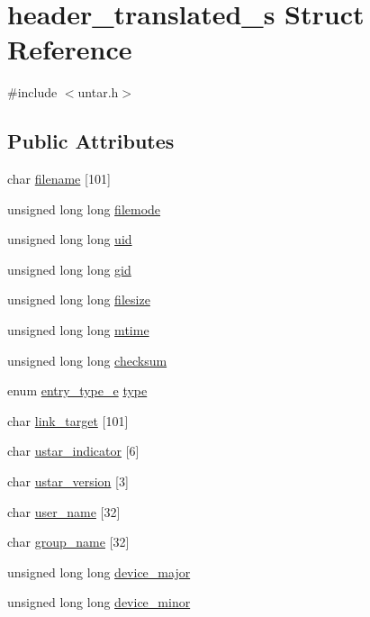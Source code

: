 \hypertarget{structheader__translated__s}{}\section{header\+\_\+translated\+\_\+s Struct Reference}
\label{structheader__translated__s}


{\ttfamily \#include $<$untar.\+h$>$}

\subsection*{Public Attributes}
\begin{DoxyCompactItemize}
\item 
char \hyperlink{structheader__translated__s_a8e1c19a3054cf023b7e78b108baef45c}{filename} \mbox{[}101\mbox{]}
\item 
unsigned long long \hyperlink{structheader__translated__s_a31c4061cea4a16bde23daf082218b73a}{filemode}
\item 
unsigned long long \hyperlink{structheader__translated__s_a96d092493dbb8933f403e812b725fe43}{uid}
\item 
unsigned long long \hyperlink{structheader__translated__s_a5ec5aa66c986221fe02c9ec437b8fb22}{gid}
\item 
unsigned long long \hyperlink{structheader__translated__s_afffca9a9976159cbd2db3f5700a0e116}{filesize}
\item 
unsigned long long \hyperlink{structheader__translated__s_a75af6a2c5b2cd7862390aef0d156b72d}{mtime}
\item 
unsigned long long \hyperlink{structheader__translated__s_adae17e48c6e4b2ba5c4fbb662b60506e}{checksum}
\item 
enum \hyperlink{untar_8h_a80803970220f2aa0557f3e438ea74705}{entry\+\_\+type\+\_\+e} \hyperlink{structheader__translated__s_ac202fb66f8998004fac83c7f7eb2039b}{type}
\item 
char \hyperlink{structheader__translated__s_a1948810ced15a4aeb3bcd66b421e409b}{link\+\_\+target} \mbox{[}101\mbox{]}
\item 
char \hyperlink{structheader__translated__s_a9b6bda43cd091bce7cc5cffa9dfbc038}{ustar\+\_\+indicator} \mbox{[}6\mbox{]}
\item 
char \hyperlink{structheader__translated__s_a6cebb43238e53d4707db8b9c58e72416}{ustar\+\_\+version} \mbox{[}3\mbox{]}
\item 
char \hyperlink{structheader__translated__s_a8edc0b461bf468c961de9d927f961128}{user\+\_\+name} \mbox{[}32\mbox{]}
\item 
char \hyperlink{structheader__translated__s_a1fd13d17c244c7a39aa7e4221c8fcb3c}{group\+\_\+name} \mbox{[}32\mbox{]}
\item 
unsigned long long \hyperlink{structheader__translated__s_acc11905fa18c57b91cd81ea230eecced}{device\+\_\+major}
\item 
unsigned long long \hyperlink{structheader__translated__s_a5ea2ccb91566969da9e20e51315e3daa}{device\+\_\+minor}
\end{DoxyCompactItemize}


